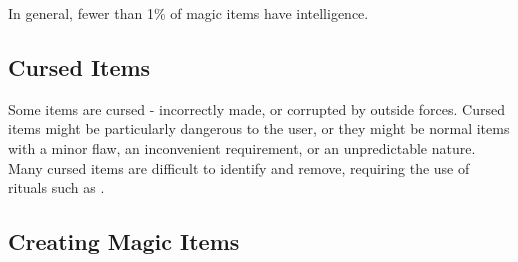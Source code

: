 In general, fewer than 1\% of magic items have intelligence.

\subsection{Cursed Items}

Some items are cursed - incorrectly made, or corrupted by outside forces.
Cursed items might be particularly dangerous to the user, or they might be normal items with a minor flaw, an inconvenient requirement, or an unpredictable nature.
Many cursed items are difficult to identify and remove, requiring the use of rituals such as .
\subsection{Creating Magic Items}\label{Creating Magic Items}\label{Magic Item Creation}
